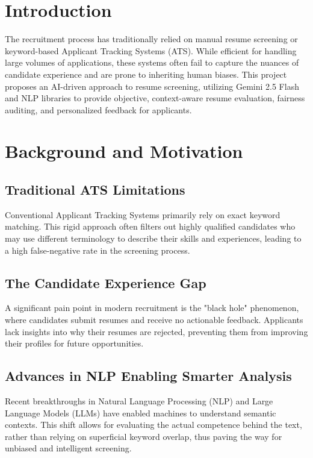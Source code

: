 \documentclass[12pt,a4paper]{article}
\begin{document}
\section{Introduction}
The recruitment process has traditionally relied on manual resume screening or keyword-based Applicant Tracking Systems (ATS). While efficient for handling large volumes of applications, these systems often fail to capture the nuances of candidate experience and are prone to inheriting human biases. This project proposes an AI-driven approach to resume screening, utilizing Gemini 2.5 Flash and NLP libraries to provide objective, context-aware resume evaluation, fairness auditing, and personalized feedback for applicants.

\section{Background and Motivation}

\subsection{Traditional ATS Limitations}
Conventional Applicant Tracking Systems primarily rely on exact keyword matching. This rigid approach often filters out highly qualified candidates who may use different terminology to describe their skills and experiences, leading to a high false-negative rate in the screening process.

\subsection{The Candidate Experience Gap}
A significant pain point in modern recruitment is the "black hole" phenomenon, where candidates submit resumes and receive no actionable feedback. Applicants lack insights into why their resumes are rejected, preventing them from improving their profiles for future opportunities.

\subsection{Advances in NLP Enabling Smarter Analysis}
Recent breakthroughs in Natural Language Processing (NLP) and Large Language Models (LLMs) have enabled machines to understand semantic contexts. This shift allows for evaluating the actual competence behind the text, rather than relying on superficial keyword overlap, thus paving the way for unbiased and intelligent screening.
\end{document}

